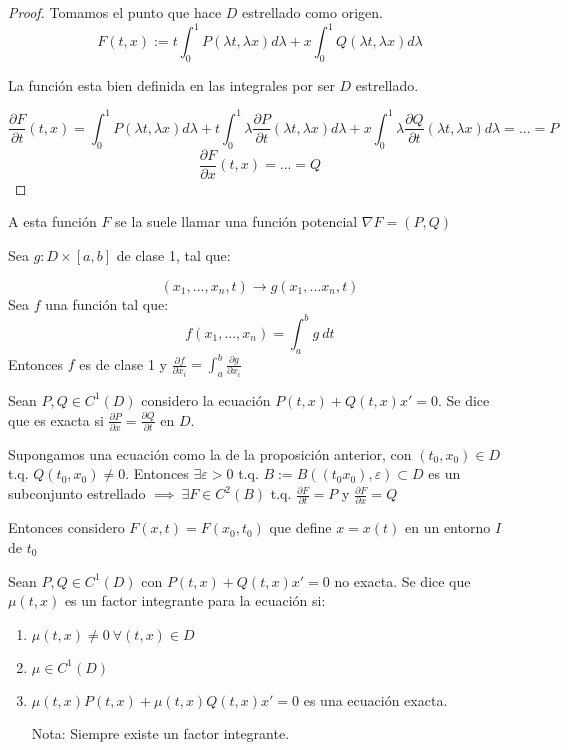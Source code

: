 \begin{proof}
Tomamos el punto que hace $D$ estrellado como origen.
\[
F(t,x) := t \int _0 ^1 P(\lambda t, \lambda x) d\lambda + x \int _0 ^1 Q(\lambda t, \lambda x ) d\lambda
\]

La función esta bien definida en las integrales por ser $D$ estrellado.

\[
\frac{\partial F}{\partial t} (t,x) = \int _0 ^1 P(\lambda t, \lambda x) d\lambda + t \int _0 ^1 \lambda \frac{\partial P}{\partial t}(\lambda t, \lambda x) d\lambda + x\int _0 ^1 \lambda \frac{\partial Q}{\partial t}(\lambda t, \lambda x) d\lambda = ... = P
\]
\[
\frac{\partial F}{\partial x} (t,x) =  ... = Q
\]

\end{proof}

A esta función $F$ se la suele llamar una función potencial $\nabla F = (P,Q)$

\begin{nth}
Sea $g: D\times [a,b]$ de clase 1, tal que: 

\[
(x_1,..., x_n, t) \to g(x_1,... x_n, t)
\]
Sea $f$ una función tal que: 
\[
f(x_1,...,x_n) = \int _a ^b g \ dt
\]
Entonces $f$ es de clase 1 y $\frac{\partial f}{\partial x_i} = \int _a ^b \frac{\partial g}{\partial x_i}$


\end{nth}
\begin{ndef}
Sean $P,Q \in C^1 (D)$ considero la ecuación $P(t,x) + Q(t,x) x' = 0$. Se dice que es exacta si $\frac{\partial P}{\partial x} = \frac{\partial Q}{\partial t}$ en $D$.
\end{ndef}

Supongamos una ecuación como la de la proposición anterior, con $(t_0, x_0) \in D$ t.q. $Q(t_0, x_0) \neq 0$. Entonces $\exists \varepsilon > 0$ t.q. $B  := B( (t_0 x_0 ), \varepsilon) \subset D$ es un subconjunto estrellado $\implies \ \exists F \in C^2 (B)$ t.q. $\frac{\partial F}{\partial t} = P$ y $\frac{\partial F}{\partial x} = Q$

Entonces considero  $F(x,t) = F(x_0, t_0)$ que define $x=x(t)$ en un entorno $I$ de $t_0$


\begin{ndef}
Sean $P,Q \in C^1 (D)$ con $P(t,x) + Q(t,x) x' = 0$ no exacta. Se dice que $\mu (t,x)$ es un factor integrante para la ecuación si:
\begin{enumerate}
\item $\mu(t,x) \neq 0 \ \forall (t,x) \in D$
\item $\mu \in C^1 (D)$
\item $\mu (t,x)P(t,x) + \mu (t,x)Q(t,x) x' = 0$ es una ecuación exacta.

Nota: Siempre existe un factor integrante.
\end{enumerate}

\end{ndef}



